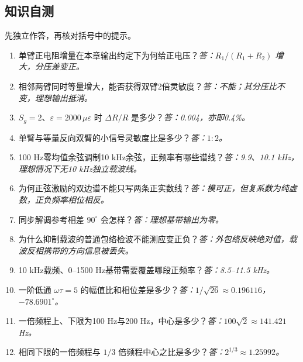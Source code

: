 \subsection*{知识自测}
先独立作答，再核对括号中的提示。
\begin{enumerate}
\item 单臂正电阻增量在本章输出约定下为何给正电压？\textit{答：$R_1/(R_1+R_2)$ 增大，分压差变正。}
\item 相邻两臂同时等量增大，能否获得双臂2倍灵敏度？\textit{答：不能；其分压比不变，理想输出抵消。}
\item $S_g=2$、$\varepsilon=2000\,\mu\varepsilon$ 时 $\Delta R/R$ 是多少？\textit{答：0.004，亦即0.4\%。}
\item 单臂与等量反向双臂的小信号灵敏度比是多少？\textit{答：$1:2$。}
\item 100 Hz零均值余弦调制10 kHz余弦，正频率有哪些谱线？\textit{答：9.9、10.1 kHz，理想情况下无10 kHz独立载波线。}
\item 为何正弦激励的双边谱不能只写两条正实数线？\textit{答：模可正，但复系数为纯虚数，正负频率相位相反。}
\item 同步解调参考相差 $90^\circ$ 会怎样？\textit{答：理想基带输出为零。}
\item 为什么抑制载波的普通包络检波不能测应变正负？\textit{答：外包络反映绝对值，载波反相携带的方向信息被丢失。}
\item 10 kHz载频、0--1500 Hz基带需要覆盖哪段正频率？\textit{答：8.5--11.5 kHz。}
\item 一阶低通 $\omega\tau=5$ 的幅值比和相位差是多少？\textit{答：$1/\sqrt{26}\approx0.196116$，$-78.6901^\circ$。}
\item 一倍频程上、下限为100 Hz与200 Hz，中心是多少？\textit{答：$100\sqrt2\approx141.421$ Hz。}
\item 相同下限的一倍频程与 $1/3$ 倍频程中心之比是多少？\textit{答：$2^{1/3}\approx1.25992$。}
\end{enumerate}

